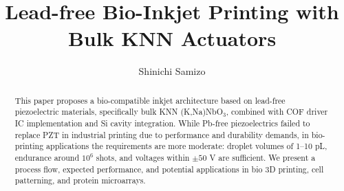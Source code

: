 \documentclass[conference]{IEEEtran}
\title{Lead-free Bio-Inkjet Printing with Bulk KNN Actuators}
\author{Shinichi Samizo}
\begin{document}
\maketitle

\begin{abstract}
This paper proposes a bio-compatible inkjet architecture based on
lead-free piezoelectric materials, specifically bulk KNN (K,Na)NbO$_3$,
combined with COF driver IC implementation and Si cavity integration.
While Pb-free piezoelectrics failed to replace PZT in industrial
printing due to performance and durability demands, in bio-printing
applications the requirements are more moderate: droplet volumes of
1--10 pL, endurance around $10^6$ shots, and voltages within $\pm50$ V
are sufficient. We present a process flow, expected performance, and
potential applications in bio 3D printing, cell patterning, and
protein microarrays.
\end{abstract}









\end{document}
